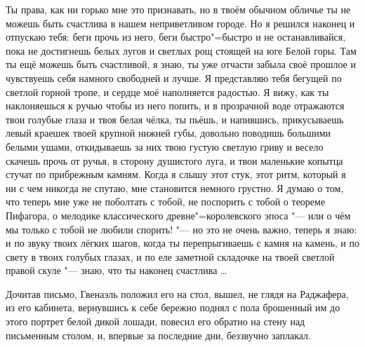 Ты права, как ни горько мне это признавать, но в твоём обычном обличье ты не
можешь быть счастлива в нашем неприветливом городе.
Но я решился наконец и отпускаю тебя: беги прочь из него, беги быстро"=быстро и
не останавливайся, пока не достигнешь белых лугов и светлых рощ стоящей на юге
Белой горы.
Там ты ещё можешь быть счастливой, я знаю, ты уже отчасти забыла своё прошлое и
чувствуешь себя намного свободней и лучше.
Я представляю тебя бегущей по светлой горной тропе, и сердце моё наполняется
радостью.
Я вижу, как ты наклоняешься к ручью чтобы из него попить, и в прозрачной воде
отражаются твои голубые глаза и твоя белая чёлка, ты пьёшь, и напившись,
прикусываешь левый краешек твоей крупной нижней губы, довольно поводишь большими
белыми ушами, откидываешь за них твою густую светлую гриву и весело скачешь
прочь от ручья, в сторону душистого луга, и твои маленькие копытца стучат по
прибрежным камням.
Когда я слышу этот стук, этот ритм, который я ни с чем никогда не спутаю, мне
становится немного грустно.
Я думаю о том, что теперь мне уже не поболтать с тобой, не поспорить с тобой о
теореме Пифагора, о мелодике классического древне"=королевского эпоса "--- или о
чём мы только с тобой не любили спорить! "--- но это не очень важно, теперь я
знаю: и по звуку твоих лёгких шагов, когда ты перепрыгиваешь с камня на камень,
и по свету в твоих голубых глазах, и по еле заметной складочке на твоей светлой
правой скуле "--- знаю, что ты наконец счастлива \ldots

\medskip
Дочитав письмо, Гвенаэль положил его на стол, вышел, не глядя на Раджафера, из
его кабинета, вернувшись к себе бережно поднял с пола брошенный им до этого
портрет белой дикой лошади, повесил его обратно на стену над письменным столом,
и, впервые за последние дни, беззвучно заплакал.
